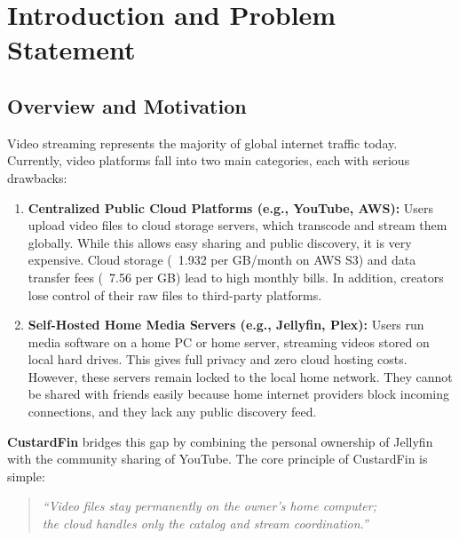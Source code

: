 
\chapter{Introduction and Problem Statement}
\label{chap:introduction}

\section{Overview and Motivation}
\label{sec:overview_motivation}

Video streaming represents the majority of global internet traffic today. Currently, video platforms fall into two main categories, each with serious drawbacks:

\begin{enumerate}
    \item \textbf{Centralized Public Cloud Platforms (e.g., YouTube, AWS):} Users upload video files to cloud storage servers, which transcode and stream them globally. While this allows easy sharing and public discovery, it is very expensive. Cloud storage (\rupee~1.932 per GB/month on AWS S3) and data transfer fees (\rupee~7.56 per GB) lead to high monthly bills. In addition, creators lose control of their raw files to third-party platforms.
    
    \item \textbf{Self-Hosted Home Media Servers (e.g., Jellyfin, Plex):} Users run media software on a home PC or home server, streaming videos stored on local hard drives. This gives full privacy and zero cloud hosting costs. However, these servers remain locked to the local home network. They cannot be shared with friends easily because home internet providers block incoming connections, and they lack any public discovery feed.
\end{enumerate}

\textbf{CustardFin} bridges this gap by combining the personal ownership of Jellyfin with the community sharing of YouTube. The core principle of CustardFin is simple:

\begin{quote}
\centering
\itshape
``Video files stay permanently on the owner's home computer;\\
the cloud handles only the catalog and stream coordination.''
\end{quote}

